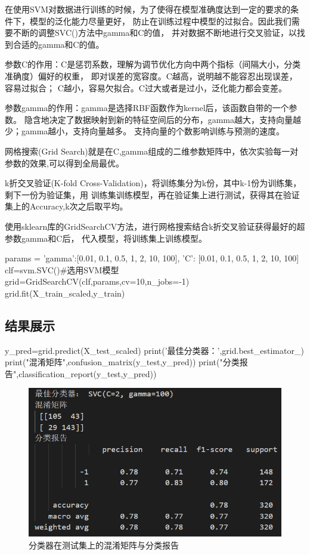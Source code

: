 \documentclass[UTF8]{ctexart}
\begin{document}
        在使用SVM对数据进行训练的时候，为了使得在模型准确度达到一定的要求的条件下，模型的泛化能力尽量更好，
        防止在训练过程中模型的过拟合。因此我们需要不断的调整SVC()方法中gamma和C的值，
        并对数据不断地进行交叉验证，以找到合适的gamma和C的值。

        参数C的作用：C是惩罚系数，理解为调节优化方向中两个指标（间隔大小，分类准确度）偏好的权重，
        即对误差的宽容度。C越高，说明越不能容忍出现误差，容易过拟合；
        C越小，容易欠拟合。C过大或者是过小，泛化能力都会变差。

        参数gamma的作用：gamma是选择RBF函数作为kernel后，该函数自带的一个参数。
        隐含地决定了数据映射到新的特征空间后的分布，gamma越大，支持向量越少；gamma越小，支持向量越多。
        支持向量的个数影响训练与预测的速度。

        网格搜索(Grid Search)就是在C,gamma组成的二维参数矩阵中，依次实验每一对参数的效果,可以得到全局最优。

        k折交叉验证(K-fold Cross-Validation)，将训练集分为k份，其中k-1份为训练集，剩下一份为验证集，用
        训练集训练模型，再在验证集上进行测试，获得其在验证集上的Accuracy,k次之后取平均。

        使用sklearn库的GridSearchCV方法，进行网格搜索结合k折交叉验证获得最好的超参数gamma和C后，
        代入模型，将训练集上训练模型。
            \begin{python}
params = {
    'gamma':[0.01, 0.1, 0.5, 1, 2, 10, 100],
    'C': [0.01, 0.1, 0.5, 1, 2, 10, 100]
    }
clf=svm.SVC()#选用SVM模型
grid=GridSearchCV(clf,params,cv=10,n_jobs=-1)
grid.fit(X_train_scaled,y_train)
            \end{python}
        \subsection{结果展示}
            \begin{python}
y_pred=grid.predict(X_test_scaled)
print('最佳分类器：',grid.best_estimator_)
print("混淆矩阵\n",confusion_matrix(y_test,y_pred))
print("分类报告\n",classification_report(y_test,y_pred))
            \end{python}
            \begin{figure}[htbp]
                \centering
                \includegraphics[scale=1]{result.png}
                \caption{分类器在测试集上的混淆矩阵与分类报告}
                \label{figure2}
            \end{figure}
\end{document}
